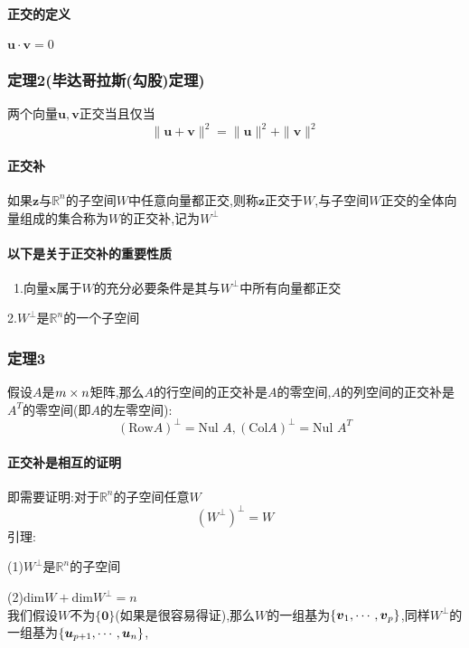 \documentclass{article}
\newcommand{\RR}{\mathbb{R}}
\newcommand{\ve}{\boldsymbol}
\newcommand{\row}{\text{Row}}
\begin{document}
\begin{CJK}{UTF8}{gkai}
\paragraph{正交的定义} $\ve{u} \cdot \ve{v} = 0$

\subsubsection{定理2(毕达哥拉斯(勾股)定理)}
两个向量$\ve{u},\ve{v}$正交当且仅当
\[\|\ve{u} + \ve{v}\|^2 = \|\ve{u}\|^2 + \|\ve{v}\|^2\]

\paragraph{正交补\\}
如果$\ve{z}$与$\RR^n$的子空间$W$中任意向量都正交,则称$\ve{z}$正交于$W$,与子空间$W$正交的全体向量组成的集合称为$W$的正交补,记为$W^{\bot}$\\

\paragraph{以下是关于正交补的重要性质\\}

~1.向量$\ve{x}$属于$W$的充分必要条件是其与$W^{\bot}$中所有向量都正交

2.$W^{\bot}$是$\RR^n$的一个子空间

\subsubsection{定理3}
假设$A$是$m\times n$矩阵,那么$A$的行空间的正交补是$A$的零空间,$A$的列空间的正交补是$A^T$的零空间(即$A$的左零空间):\\
\[(\row A )^{\bot} = \text{Nul } A ,(\text{Col} A )^{\bot} = \text{Nul } A^T \]

\paragraph{正交补是相互的证明}
即需要证明:对于$\RR^n$的子空间任意$W$
\[(W^{\bot})^{\bot} = W\]
引理:

(1)$W^{\bot}$是$\RR^n$的子空间

(2)$\text{dim} W + \text{dim} W^{\bot} = n$\\

我们假设$W$不为$\{\ve{0}\}$(如果是很容易得证),那么$W$的一组基为$\{\vs{v}{1}{p}\}$,同样$W^{\bot}$的一组基为$\{\vs{u}{p+1}{n}\}$,


\end{CJK}
\end{document}
